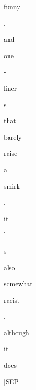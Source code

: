 \documentclass[varwidth=150mm]{standalone}
\begin{document}
\begin{CJK*}{UTF8}{gbsn}
{{{\colorbox{red!0.0}{\strut funny} \colorbox{red!0.0}{\strut ,} \colorbox{red!0.0}{\strut and} \colorbox{red!0.0}{\strut one} \colorbox{red!0.0}{\strut -} \colorbox{red!0.0}{\strut liner}\colorbox{red!0.0}{\strut s} \colorbox{red!0.0}{\strut that} \colorbox{red!0.0}{\strut barely} \colorbox{red!0.0}{\strut raise} \colorbox{red!0.0}{\strut a} \colorbox{red!0.0}{\strut smirk} \colorbox{red!0.0}{\strut .} \colorbox{red!4.436522006988525}{\strut it} \colorbox{red!0.0}{\strut '} \colorbox{red!1.463356852531433}{\strut s} \colorbox{red!0.0}{\strut also} \colorbox{red!0.0}{\strut somewhat} \colorbox{red!0.0}{\strut racist} \colorbox{red!0.0}{\strut ,} \colorbox{red!0.0}{\strut although} \colorbox{red!2.2973573207855225}{\strut it} \colorbox{red!0.0}{\strut does} \colorbox{red!0.0}{\strut [SEP]}
}}}
\end{CJK*}
\end{document}
